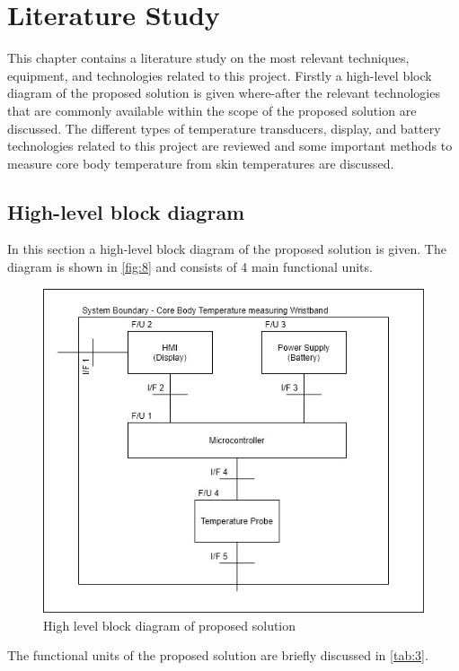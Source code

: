 \chapter{Literature Study}\label{Ch2}
This chapter contains a literature study on the most relevant techniques, equipment, and technologies related to this project. Firstly a high-level block diagram of the proposed solution is given where-after the relevant technologies that are commonly available within the scope of the proposed solution are discussed. The different types of temperature transducers, display, and battery technologies related to this project are reviewed and some important methods to measure core body temperature from skin temperatures are discussed. 

\section{High-level block diagram}
In this section a high-level block diagram of the proposed solution is given. The diagram is shown in \autoref{fig:8} and consists of 4 main functional units. 
\begin{figure}[H]
	\centering
	\includegraphics[scale=0.7]{img/High-level-block-diagram}
	\caption{High level block diagram of proposed solution}
	\label{fig:8}
\end{figure}
\noindent
The functional units of the proposed solution are briefly discussed in \autoref{tab:3}.
